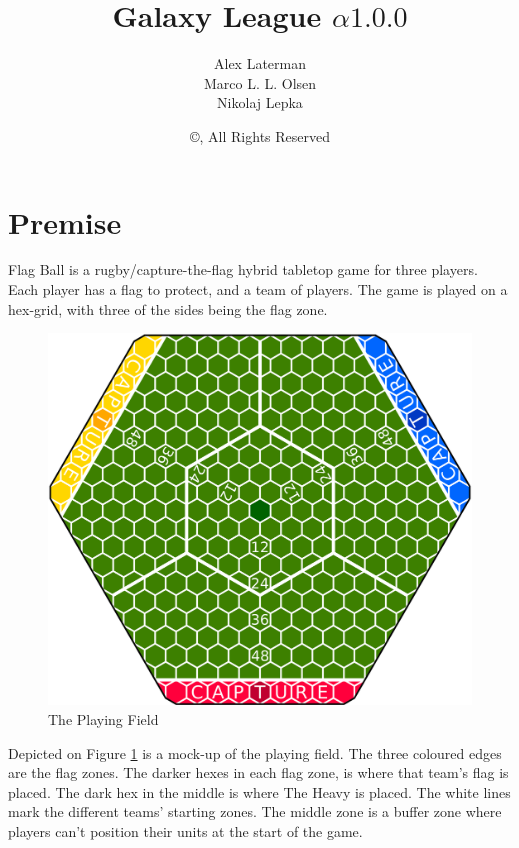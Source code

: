 \documentclass{book}
\title{Galaxy League $\alpha1.0.0$}
\author{Alex Laterman\\ Marco L. L. Olsen\\ Nikolaj Lepka}
\date{\copyright \the\year{}, All Rights Reserved}
\begin{document}
\maketitle

\section*{Premise}
Flag Ball is a rugby/capture-the-flag hybrid tabletop game for three players.
Each player has a flag to protect, and a team of players.
The game is played on a hex-grid, with three of the sides being the flag zone.
\begin{figure}
    \centering
    \includegraphics[width=\textwidth]{graphics/board-2}
    \caption{The Playing Field}
    \label{fig:court}
\end{figure}
Depicted on Figure \ref{fig:court} is a mock-up of the playing field.
The three coloured edges are the flag zones.
The darker hexes in each flag zone, is where that team's flag is placed.
The dark hex in the middle is where The Heavy is placed.
The white lines mark the different teams' starting zones.
The middle zone is a buffer zone where players can’t position their units at the start of the game.

\tableofcontents




\end{document}
